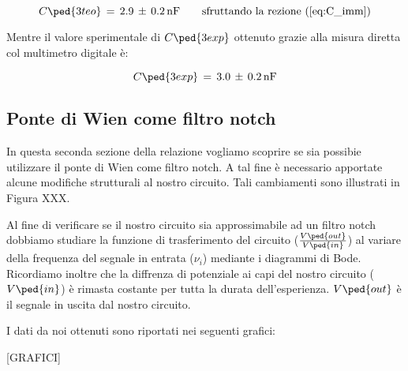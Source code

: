 \begin{equation}
	C\ped{3teo} \,=\, 2.9 \,\pm\, 0.2 \,\si{\nano\farad}  \qquad \text{sfruttando la rezione (\ref{eq:C_imm})}
	\label{eq:C_teo_imm}
\end{equation}

Mentre il valore sperimentale di $C\ped{3exp}$ ottenuto grazie alla misura diretta col multimetro digitale è:

\begin{equation}
	C\ped{3exp} \,=\, 3.0 \,\pm\, 0.2 \,\si{\nano\farad}
	\label{eq:C_exp} 
\end{equation}

\subsection*{Ponte di Wien come filtro notch}

In questa seconda sezione della relazione vogliamo scoprire se sia possibie utilizzare il ponte di Wien come filtro notch. A tal fine è necessario apportate alcune modifiche strutturali al nostro circuito. Tali cambiamenti sono illustrati in Figura XXX.

Al fine di verificare se il nostro circuito sia approssimabile ad un filtro notch dobbiamo studiare la funzione di trasferimento del circuito ($\frac{V\ped{out}}{V\ped{in}}$) al variare della frequenza del segnale in entrata ($\nu_i$) mediante i diagrammi di Bode. Ricordiamo inoltre che la diffrenza di potenziale ai capi del nostro circuito ($V\ped{in}$) è rimasta costante per tutta la durata dell'esperienza. $V\ped{out}$ è il segnale in uscita dal nostro circuito.

I dati da noi ottenuti sono riportati nei seguenti grafici:

[GRAFICI]